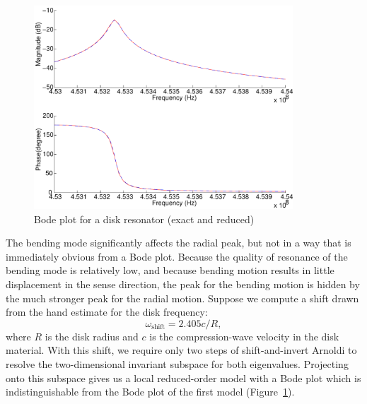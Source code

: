\documentclass{article}
\begin{document}
\begin{figure}
  \label{disk-bode}
  \begin{center}
    \includegraphics[height=3in]{rombode1.pdf}
    \caption{Bode plot for a disk resonator (exact and reduced)}
  \end{center}
\end{figure}

The bending mode significantly affects the radial peak, but not in a
way that is immediately obvious from a Bode plot.  Because the quality
of resonance of the bending mode is relatively low, and because
bending motion results in little displacement in the sense direction,
the peak for the bending motion is hidden by the much stronger peak
for the radial motion.  Suppose we compute a shift drawn from the hand
estimate for the disk frequency:
\begin{equation}
  \omega_\mathrm{shift} = 2.405 c/R,
\end{equation}
where $R$ is the disk radius and $c$ is the compression-wave velocity
in the disk material.  With this shift, we require only two steps of
shift-and-invert Arnoldi to resolve the two-dimensional invariant
subspace for both eigenvalues.  Projecting onto this subspace gives us
a local reduced-order model with a Bode plot which is indistinguishable
from the Bode plot of the first model (Figure~\ref{disk-bode}).



\end{document}

